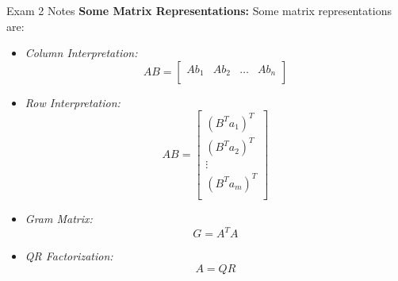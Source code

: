 \begin{examnotes}{Exam 2 Notes}
    \textbf{Some Matrix Representations:} Some matrix representations are:
    \begin{itemize}
        \item \textit{Column Interpretation:}
        \begin{equation*}
            AB = 
            \begin{bmatrix}
                Ab_{1} & Ab_{2} & \dots & Ab_{n} \\
            \end{bmatrix}
        \end{equation*}
        \item \textit{Row Interpretation:}
        \begin{equation*}
            AB = 
            \begin{bmatrix}
                (B^{T}a_{1})^{T} \\
                (B^{T}a_{2})^{T} \\
                \vdots \\
                (B^{T}a_{m})^{T} \\
            \end{bmatrix}
        \end{equation*}
        \item \textit{Gram Matrix:}
        \begin{equation*}
            G = A^{T}A
        \end{equation*}
        \item \textit{QR Factorization:}
        \begin{equation*}
            A = QR
        \end{equation*}
    \end{itemize}


\end{examnotes}
